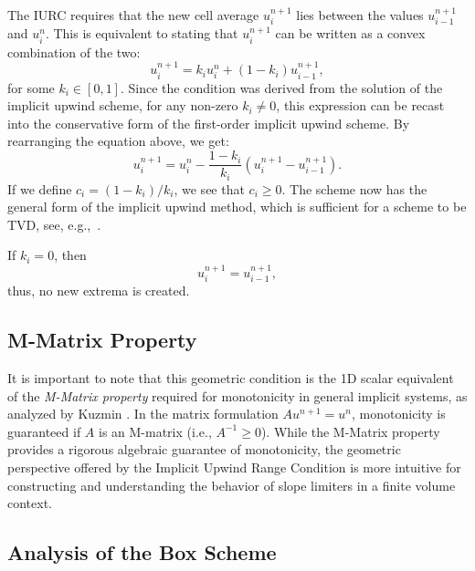 The IURC requires that the new cell average \(u_{i}^{n+1}\) lies between the values \(u_{i-1}^{n+1}\) and \(u_{i}^{n}\).
This is equivalent to stating that \(u_{i}^{n+1}\) can be written as a convex combination of the two:
\begin{equation}
    u_{i}^{n+1} = k_i u_{i}^{n} + (1-k_i)u_{i-1}^{n+1},
\end{equation}
for some \(k_i \in [0, 1]\).
Since the condition was derived from the solution of the implicit upwind scheme, for any non-zero \(k_i \neq 0 \), this expression can be recast into the conservative form of the first-order implicit upwind scheme.
By rearranging the equation above, we get:
\begin{equation}
    u_{i}^{n+1} = u_{i}^{n} - \frac{1-k_i}{k_i} \left( u_{i}^{n+1} - u_{i-1}^{n+1} \right).
\end{equation}
If we define \(c_i = (1-k_i)/k_i\), we see that \(c_i \ge 0\).
The scheme now has the general form of the implicit upwind method, which is sufficient for a scheme to be TVD, see, e.g.,~\cite{duraisamy2007implicit,frolkovic2023high}.

If \(k_{i} = 0\), then
\[
    u_{i}^{n+1} = u_{i-1}^{n+1},
\]
thus, no new extrema is created.

\subsection{M-Matrix Property}%
\label{sub:implicit_m_matrix}

It is important to note that this geometric condition is the 1D scalar equivalent of the \textit{M-Matrix property} required for monotonicity in general implicit systems, as analyzed by Kuzmin \cite{kuzmin2014hierarchical}.
In the matrix formulation \(A u^{n+1} = u^n\), monotonicity is guaranteed if \(A\) is an M-matrix (i.e., \(A^{-1} \geq 0\)).
While the M-Matrix property provides a rigorous algebraic guarantee of monotonicity, the geometric perspective offered by the Implicit Upwind Range Condition is more intuitive for constructing and understanding the behavior of slope limiters in a finite volume context.

\subsection{Analysis of the Box Scheme}
\label{sec:box_scheme_iurc_analysis}

